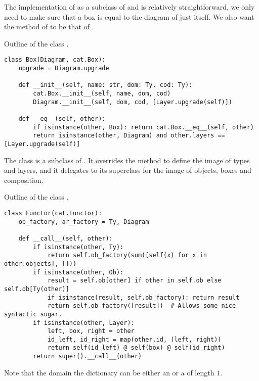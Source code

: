 The implementation of  as a subclass of  and  is relatively straightforward, we only need to make sure that a box is equal to the diagram of just itself.
We also want the  method of  to be that of .

\begin{python}
{\normalfont Outline of the class .}
\begin{verbatim}
class Box(Diagram, cat.Box):
    upgrade = Diagram.upgrade

    def __init__(self, name: str, dom: Ty, cod: Ty):
        cat.Box.__init__(self, name, dom, cod)
        Diagram.__init__(self, dom, cod, [Layer.upgrade(self)])

    def __eq__(self, other):
        if isinstance(other, Box): return cat.Box.__eq__(self, other)
        return isinstance(other, Diagram) and other.layers == [Layer.upgrade(self)]
\end{verbatim}
\end{python}

The  class is a subclass of .
It overrides the  method to define the image of types and layers, and it delegates to its superclass for the image of objects, boxes and composition.

\begin{python}
{\normalfont Outline of the class .}
\begin{verbatim}
class Functor(cat.Functor):
    ob_factory, ar_factory = Ty, Diagram

    def __call__(self, other):
        if isinstance(other, Ty):
            return self.ob_factory(sum([self(x) for x in other.objects], []))
        if isinstance(other, Ob):
            result = self.ob[other] if other in self.ob else self.ob[Ty(other)]
            if isinstance(result, self.ob_factory): return result
            return self.ob_factory([result])  # Allows some nice syntactic sugar.
        if isinstance(other, Layer):
            left, box, right = other
            id_left, id_right = map(other.id, (left, right))
            return self(id_left) @ self(box) @ self(id_right)
        return super().__call__(other)
\end{verbatim}

Note that the domain the dictionary  can be either an  or a  of length $1$.
\end{python}

